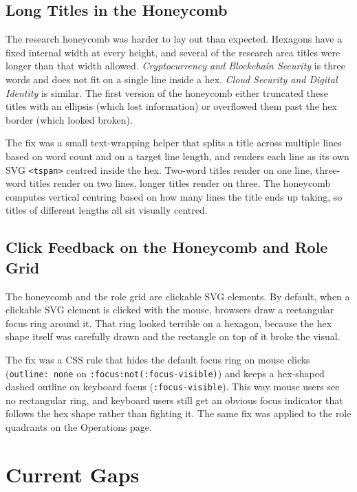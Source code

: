 \subsection{Long Titles in the Honeycomb}\label{subsec:challenges-honeycomb}

The research honeycomb was harder to lay out than expected. Hexagons have a fixed internal width at every height, and several of the research area titles were longer than that width allowed. \textit{Cryptocurrency and Blockchain Security} is three words and does not fit on a single line inside a hex. \textit{Cloud Security and Digital Identity} is similar. The first version of the honeycomb either truncated these titles with an ellipsis (which lost information) or overflowed them past the hex border (which looked broken).

The fix was a small text-wrapping helper that splits a title across multiple lines based on word count and on a target line length, and renders each line as its own SVG \texttt{<tspan>} centred inside the hex. Two-word titles render on one line, three-word titles render on two lines, longer titles render on three. The honeycomb computes vertical centring based on how many lines the title ends up taking, so titles of different lengths all sit visually centred.

\subsection{Click Feedback on the Honeycomb and Role Grid}\label{subsec:challenges-focus}

The honeycomb and the role grid are clickable SVG elements. By default, when a clickable SVG element is clicked with the mouse, browsers draw a rectangular focus ring around it. That ring looked terrible on a hexagon, because the hex shape itself was carefully drawn and the rectangle on top of it broke the visual.

The fix was a CSS rule that hides the default focus ring on mouse clicks (\texttt{outline: none} on \texttt{:focus:not(:focus-visible)}) and keeps a hex-shaped dashed outline on keyboard focus (\texttt{:focus-visible}). This way mouse users see no rectangular ring, and keyboard users still get an obvious focus indicator that follows the hex shape rather than fighting it. The same fix was applied to the role quadrants on the Operations page.

\section{Current Gaps}\label{sec:challenges-gaps}

